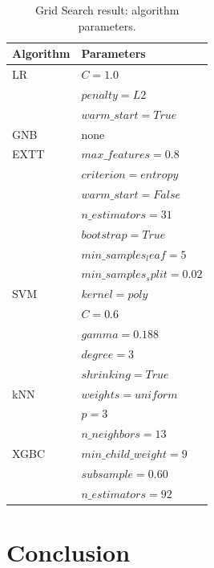 \begin{table}[h]
\centering
\caption{Grid Search result: algorithm parameters.}
\label{tab:params}
\begin{tabular}{| l | l |}
\hline
Algorithm & Parameters \\ \hline 
LR        & $C = 1.0$ \\ 
          & $penalty = L2$ \\
          & $warm\_start = True$ \\ \hline
GNB       & none \\ \hline
EXTT      & $max\_features=0.8$ \\ 
          & $criterion=entropy$ \\
          & $warm\_start=False$ \\
          & $n\_estimators=31$ \\
          & $bootstrap=True$ \\
          & $min\_samples_leaf=5$ \\ 
          & $min\_samples_split=0.02$ \\ \hline
SVM       & $kernel=poly$ \\
          & $C=0.6$ \\
          & $gamma=0.188$ \\ 
          & $degree=3$ \\
          & $shrinking=True$ \\ \hline
kNN       & $weights=uniform$ \\
          & $p=3$ \\
          & $n\_neighbors=13$ \\ \hline
XGBC      & $min\_child\_weight=9 $ \\
          & $subsample=0.60$ \\ 
          & $n\_estimators=92$ \\
\hline
\end{tabular}
\end{table}

\section{Conclusion}\label{sec:con}
